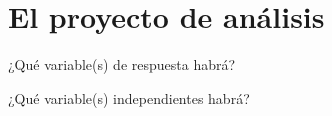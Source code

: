 \documentclass[
  11pt,
  ignorenonframetext,
]{beamer}
\begin{document}
\hypertarget{el-proyecto-de-anuxe1lisis}{%
\section{El proyecto de análisis}\label{el-proyecto-de-anuxe1lisis}}

\begin{frame}{¿Qué variable(s) de respuesta habrá?}
\protect\hypertarget{quuxe9-variables-de-respuesta-habruxe1}{}
\end{frame}

\begin{frame}{¿Qué variable(s) independientes habrá?}
\protect\hypertarget{quuxe9-variables-independientes-habruxe1}{}
\end{frame}
\end{document}
